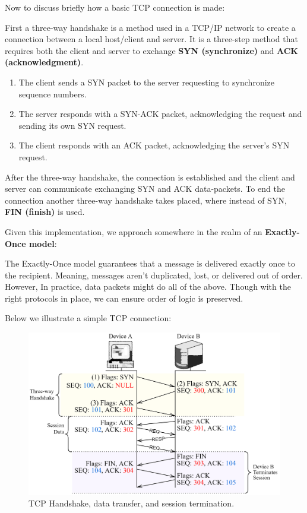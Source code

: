 \noindent
Now to discuss briefly how a basic TCP connection is made:
\begin{Def}

    First a three-way handshake is a method used in a TCP/IP network to create a connection between a local host/client and server. 
    It is a three-step method that requires both the client and server to exchange \textbf{SYN (synchronize)}
     and \textbf{ACK (acknowledgment)}.
     \begin{enumerate}
        \item The client sends a SYN packet to the server requesting to synchronize sequence numbers.
        \item The server responds with a SYN-ACK packet, acknowledging the request and sending its own SYN request.
        \item The client responds with an ACK packet, acknowledging the server's SYN request.
     \end{enumerate}
    
    \noindent
    After the three-way handshake, the connection is established and the client and server can communicate exchanging SYN and ACK data-packets.
    To end the connection another three-way handshake takes placed, where instead of SYN, \textbf{FIN (finish)} is used.
    
\end{Def}

\noindent
Given this implementation, we approach somewhere in the realm of an \textbf{Exactly-Once model}:

\begin{Def}

    The Exactly-Once model guarantees that a message is delivered exactly once to the recipient. Meaning, messages aren't duplicated, lost, or delivered out of order.
    However, In practice, data packets might do all of the above. Though with the right
    protocols in place, we can ensure order of logic is preserved.
\end{Def}

\newpage 
\noindent
Below we illustrate a simple TCP connection:
\begin{figure}[h]
    \centering
    \includegraphics[width=.9\textwidth]{Sections/rpc/sync.png}
    \caption{TCP Handshake, data transfer, and session termination.}
    \label{fig:tcp}
\end{figure}

